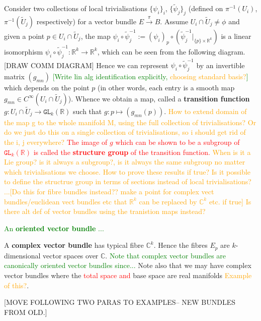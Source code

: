 \documentclass[a4paper]{article}
\theoremstyle{definition} \newtheorem*{definition}{Definition}
\theoremstyle{definition} \newtheorem*{definitions}{Definitions}
\theoremstyle{plain} \newtheorem{theorem}{Theorem}[section]
\theoremstyle{plain} \newtheorem{proposition}[theorem]{Proposition}
\theoremstyle{plain} \newtheorem{corollary}[theorem]{Corollary}
\theoremstyle{plain} \newtheorem{lemma}[theorem]{Lemma}
\theoremstyle{plain} \newtheorem{example}[theorem]{Example}
\newcommand{\checkCorrect}[1]{\textcolor{red}{#1}}
\newcommand{\question}[1]{\textcolor{orange}{#1}}
\newcommand{\finish}[1]{\textcolor{green}{#1}}
\newcommand{\defn}[1]{\textbf{#1}}
\newcommand{\realnos}{\mathbb{R}}
\newcommand{\complexnos}{\mathbb{C}}
\begin{document}
Consider two collections of local trivialisations $\{\psi_i \}_i$, $\{\tilde{\psi}_j\}_j$ (defined on $\pi^{-1}(U_i)$, $\pi^{-1}(\tilde{U}_j)$ respectively) 
for a vector bundle $E\xrightarrow{\pi} B$. Assume $U_i \cap \tilde{U}_j\neq \phi$ and given a 
point $p\in U_i \cap \tilde{U}_j$, the map $\psi_i \circ \tilde{\psi}_j^{-1}:=(\psi_i)_p \circ (\tilde{\psi}_j^{-1}\vert_{\{p\}\times \realnos^k})$ 
is a linear isomorphism $\psi_i \circ \tilde{\psi}_j^{-1} : \realnos^k \rightarrow \realnos^k$, 
which can be seen from the following diagram.
[DRAW COMM DIAGRAM]
Hence we can represent $\psi_i \circ \tilde{\psi}_j^{-1}$ by an invertible matrix $(g_{mn})$ \finish{[Write lin alg identification explicitly, \question{choosing standard basis?}]} which depends on the point $p$ (in other words, each entry is a smooth map $g_{mn}\in C^\infty(U_i\cap \tilde{U}_j)$). Whence we obtain a map, called a \defn{transition function}
$g:U_i\cap \tilde{U}_j\rightarrow \mathtt{GL}_k(\realnos)$ such that $g:p\mapsto (g_{mn}(p))$. \question{How to extend domain of the map g to the whole manifold M, using the full collection of trivialisations? Or do we just do this on a single collection of trivialisations, so i should get rid of the i, j everywhere?} \checkCorrect{The image of $g$ which can be shown to be a subgroup of $\mathtt{GL}_k(\realnos)$ is called the \defn{structure group} of the transition function.} \question{When is it a Lie group? is it always a subgroup?, is it always the same subgroup no matter which trivialisations we choose. How to prove these results if true?} \question{Is it possible to define the structrue group in terms of sections instead of local trivialisations?}
\question{...[Do this for fibre bundles instead?? make a point for complex vect bundles/euclidean vect bundles etc that $\realnos^k$ can be replaced by $\complexnos^k$ etc. if true]}
\question{Is there alt def of vector bundles using the tranistion maps instead?}

\finish{An \defn{oriented vector bundle} ...}

A \defn{complex vector bundle} has typical fibre $\complexnos^k$. Hence the fibres $E_p$ are $k$-dimensional vector spaces over $\complexnos$. \finish{Note that complex vector bundles are canonically oriented vector bundles since...} Note also that we may have complex vector bundles where the \checkCorrect{total space and} base space are real manifolds \question{Example of this?}.

[MOVE FOLLOWING TWO PARAS TO EXAMPLES-- NEW BUNDLES FROM OLD.]
\end{document}
